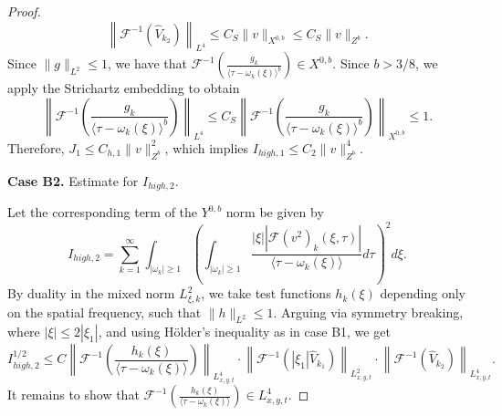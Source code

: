 \documentclass[11pt]{article}
\numberwithin{equation}{section}
\begin{document}
\begin{proof}
\begin{equation}
\left\|\mathcal{F}^{-1}\left(\widehat{V}_{k_{2}}\right)\right\|_{L^{4}} \leq C_{S} \|v\|_{X^{0,b}} \leq C_{S} \|v\|_{Z^{b}}.
\end{equation}
Since $\|g\|_{L^{2}} \le 1$, we have that $\mathcal{F}^{-1}\left(\frac{g_{k}}{\langle \tau - \omega_{k}(\xi) \rangle^{b}}\right) \in X^{0,b}$. Since $b > 3/8$, we apply the Strichartz embedding to obtain
\begin{equation}
\left\|\mathcal{F}^{-1}\left(\frac{g_{k}}{\langle \tau - \omega_{k}(\xi) \rangle^{b}}\right)\right\|_{L^4} \le C_{S}\left\|\mathcal{F}^{-1}\left(\frac{g_{k}}{\langle \tau - \omega_{k}(\xi) \rangle^{b}}\right)\right\|_{X^{0,b}} \le 1.\end{equation}
Therefore, $J_{1} \le C_{h,1}\|v\|_{Z^{b}}^{2}$, which implies $I_{high,1} \le C_{2}\|v\|_{Z^{b}}^{4}$.

\textbf{Case B2.} Estimate for $I_{high,2}$.

Let the corresponding term of the $Y^{0,b}$ norm be given by
\begin{equation}
I_{high,2} = \sum_{k=1}^{\infty} \int_{|\omega_{k}| \ge 1} \left( \int_{|\omega_{k}| \ge 1} \frac{|\xi| |\mathcal{F}(v^{2})_{k}(\xi,\tau)|}{\langle \tau - \omega_{k}(\xi) \rangle} d\tau \right)^{2} d\xi.
\end{equation}
By duality in the mixed norm $L^{2}_{\xi, k}$, we take test
functions $h_{k}(\xi)$ depending only on the spatial frequency, such
that $\|h\|_{L^{2}} \le 1$. Arguing via symmetry breaking, where
$|\xi| \le 2|\xi_{1}|$, and using Hölder's inequality as in case
B1, we get
\begin{equation}
I_{high,2}^{1/2} \le C\left\|\mathcal{F}^{-1} \left( \frac{h_{k}(\xi)}{\langle \tau - \omega_{k}(\xi) \rangle} \right)\right\|_{L^{4}_{x,y,t}} \cdot \left\|\mathcal{F}^{-1}\left(|\xi_1| \widehat{V}_{k_{1}}\right)\right\|_{L^{2}_{x,y,t}} \cdot \left\|\mathcal{F}^{-1}\left(\widehat{V}_{k_{2}}\right)\right\|_{L^{4}_{x,y,t}}.
\end{equation}
It remains to show that $\mathcal{F}^{-1} \left(
\frac{h_{k}(\xi)}{\langle \tau - \omega_{k}(\xi) \rangle} \right)
\in L^{4}_{x,y,t}$.










\end{proof}
\end{document}
